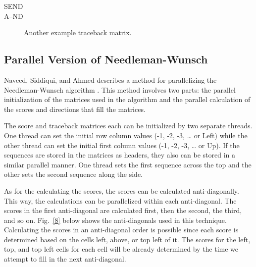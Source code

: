 \documentclass[conference]{IEEEtran}
\begin{document}
\hspace*{1em}SEND\\
\hspace*{2em}A–ND

\begin{figure}[htbp]
\centerline{}
\caption{Another example traceback matrix. \cite{vladimir}}
\label{7}
\end{figure}

\subsection{Parallel Version of Needleman-Wunsch}
Naveed, Siddiqui, and Ahmed describes a method for parallelizing the Needleman-Wunsch algorithm \cite{naveed_siddiqui_ahmed}. This method involves two parts: the parallel initialization of the matrices used in the algorithm and the parallel calculation of the scores and directions that fill the matrices.

The score and traceback matrices each can be initialized by two separate threads. One thread can set the initial row column values (-1, -2, -3, … or Left) while the other thread can set the initial first column values (-1, -2, -3, … or Up). If the sequences are stored in the matrices as headers, they also can be stored in a similar parallel manner. One thread sets the first sequence across the top and the other sets the second sequence along the side.

As for the calculating the scores, the scores can be calculated anti-diagonally. This way, the calculations can be parallelized within each anti-diagonal. The scores in the first anti-diagonal are calculated first, then the second, the third, and so on. Fig.~\ref{8} below shows the anti-diagonals used in this technique. Calculating the scores in an anti-diagonal order is possible since each score is determined based on the cells left, above, or top left of it. The scores for the left, top, and top left cells for each cell will be already determined by the time we attempt to fill in the next anti-diagonal.
\end{document}
